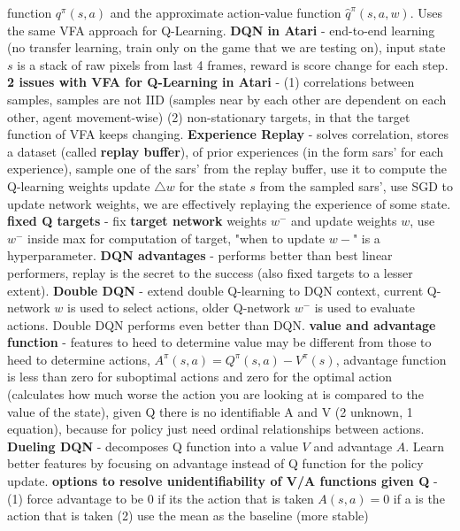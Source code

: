 \documentclass{article}
\begin{document}
\begin{itemize}
function $q^\pi(s, a)$ and the approximate action-value function $\hat{q}^\pi(s, a, w)$. Uses the same VFA approach for Q-Learning. \textbf{DQN in Atari} - end-to-end learning (no transfer learning, train only on the game that we are testing on), input state $s$ is a stack of raw pixels from last 4 frames, reward is score change for each step. \textbf{2 issues with VFA for Q-Learning in Atari} - (1) correlations between samples, samples are not IID (samples near by each other are dependent on each other, agent movement-wise) (2) non-stationary targets, in that the target function of VFA keeps changing. \textbf{Experience Replay} - solves correlation, stores a dataset (called \textbf{replay buffer}), of prior experiences (in the form sars' for each experience), sample one of the sars' from the replay buffer, use it to compute the Q-learning weights update $\triangle w$ for the state $s$ from the sampled sars', use SGD to update network weights, we are effectively replaying the experience of some state. \textbf{fixed Q targets} - fix \textbf{target network} weights $w^-$ and update weights $w$, use $w^-$ inside max for computation of target, "when to update $w-$" is a hyperparameter. \textbf{DQN advantages} - performs better than best linear performers, replay is the secret to the success (also fixed targets to a lesser extent). \textbf{Double DQN} - extend double Q-learning to DQN context, current Q-network $w$ is used to select actions, older Q-network $w^-$ is used to evaluate actions. Double DQN performs even better than DQN. \textbf{value and advantage function} - features to heed to determine value may be different from those to heed to determine actions, $A^\pi(s, a) = Q^\pi(s, a) - V^\pi(s)$, advantage function is less than zero for suboptimal actions and zero for the optimal action (calculates how much worse the action you are looking at is compared to the value of the state), given Q there is no identifiable A and V (2 unknown, 1 equation), because for policy just need ordinal relationships between actions. \textbf{Dueling DQN} - decomposes Q function into a value $V$ and advantage $A$. Learn better features by focusing on advantage instead of Q function for the policy update. \textbf{options to resolve unidentifiability of V/A functions given Q} - (1) force advantage to be 0 if its the action that is taken $A(s, a) = 0$ if a is the action that is taken (2) use the mean as the baseline (more stable)

\end{itemize}
\end{document}
